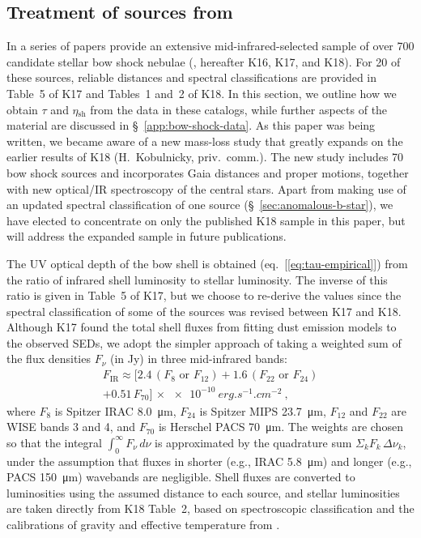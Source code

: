 \documentclass[useAMS, usenatbib, a4paper]{mnras}
\newcommand\shell{\ensuremath{_{\text{sh}}}}
\begin{document}
\subsection{Treatment of sources from \citeauthor{Kobulnicky:2018a}}
\label{sec:kobulnicky}

In a series of papers \citeauthor{Kobulnicky:2018a} provide an
extensive mid-infrared-selected sample of over 700 candidate stellar
bow shock nebulae (\citealp{Kobulnicky:2016a, Kobulnicky:2017a,
  Kobulnicky:2018a}, hereafter K16, K17, and K18).  For 20 of these
sources, reliable distances and spectral classifications are provided
in Table~5 of K17 and Tables~1 and~2 of K18. In this section, we
outline how we obtain \(\tau\) and \(\eta\shell\) from the data in
these catalogs, while further aspects of the
\citeauthor{Kobulnicky:2018a} material are discussed in
\S~\ref{app:bow-shock-data}.  As this paper was being written, we
became aware of a new mass-loss study that greatly expands on the
earlier results of K18 (H.~Kobulnicky, priv.~comm.).  The new study
includes 70 bow shock sources and incorporates Gaia distances and
proper motions, together with new optical/IR spectroscopy of the
central stars.  Apart from making use of an updated spectral
classification of one source (\S~\ref{sec:anomalous-b-star}), we have
elected to concentrate on only the published K18 sample in this paper,
but will address the expanded sample in future publications.

The UV optical depth of the bow shell is obtained
(eq.~[\ref{eq:tau-empirical}]) from the ratio of infrared shell
luminosity to stellar luminosity.  The inverse of this ratio is given
in Table~5 of K17, but we choose to re-derive the values since the
spectral classification of some of the sources was revised between K17
and K18.  Although K17 found the total shell fluxes from fitting dust
emission models to the observed SEDs, we adopt the simpler approach of
taking a weighted sum of the flux densities \(F_\nu\) (in \si{Jy}) in
three mid-infrared bands:
\begin{multline}
  \label{eq:total-ir-flux}
  F_{\text{IR}}  \approx \bigl[  2.4\,(F_8 \text{ or } F_{12})
    + 1.6\,(F_{22} \text{ or } F_{24})  \\
  + 0.51\,F_{70}\bigr]
  \,\times \SI{e-10}{erg.s^{-1}.cm^{-2}} \ ,
\end{multline}
where \(F_8\) is Spitzer IRAC \SI{8.0}{\um}, \(F_{24}\) is Spitzer
MIPS \SI{23.7}{\um}, \(F_{12}\) and \(F_{22}\) are WISE bands 3 and 4,
and \(F_{70}\) is Herschel PACS \SI{70}{\um}.  The weights are chosen
so that the integral \(\int_0^\infty F_\nu \,d\nu\) is approximated by the
quadrature sum \(\Sigma_k F_k\, \Delta\nu_k\), under the assumption that fluxes in
shorter (e.g., IRAC \SI{5.8}{\um}) and longer (e.g., PACS
\SI{150}{\um}) wavebands are negligible.  Shell fluxes are converted
to luminosities using the assumed distance to each source, and stellar
luminosities are taken directly from K18 Table~2, based on
spectroscopic classification and the calibrations of gravity and
effective temperature from \citet{Martins:2005a}.
\end{document}
